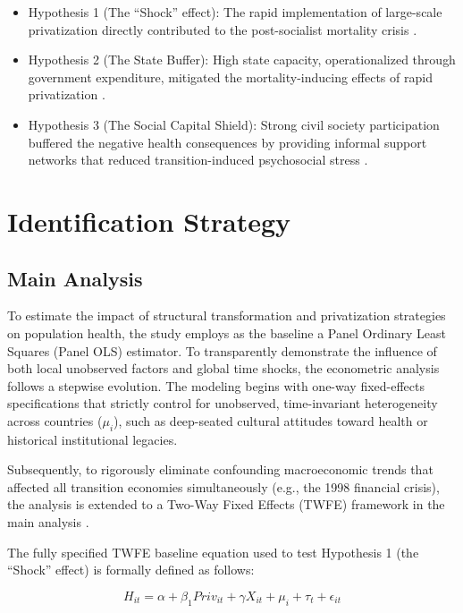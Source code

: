 \documentclass[12pt]{article}
\begin{document}
\begin{itemize}
    \item Hypothesis 1 (The ``Shock'' effect): The rapid implementation of large-scale privatization directly contributed to the post-socialist mortality crisis 
    \citep{Stuckler2009, King2009}.
    \item Hypothesis 2 (The State Buffer): High state capacity, operationalized through government expenditure, mitigated the mortality-inducing effects of rapid privatization 
    \citep{Hamm2012}.
    \item Hypothesis 3 (The Social Capital Shield): Strong civil society participation buffered the negative health consequences by providing informal support networks that reduced 
    transition-induced psychosocial stress \citep{Stuckler2009, Scheiring2018}.
\end{itemize}


\section{Identification Strategy}
\subsection{Main Analysis}

To estimate the impact of structural transformation and privatization strategies on population health, the study employs as the baseline a Panel Ordinary Least Squares (Panel OLS) estimator. To transparently 
demonstrate the influence of both local unobserved factors and global time shocks, the econometric analysis follows a stepwise evolution. The modeling begins with one-way fixed-effects 
specifications that strictly control for unobserved, time-invariant heterogeneity across countries ($\mu_{i}$), such as deep-seated cultural attitudes toward health or historical institutional 
legacies. 

Subsequently, to rigorously eliminate confounding macroeconomic trends that affected all transition economies simultaneously (e.g., the 1998 financial crisis), the analysis is extended 
to a Two-Way Fixed Effects (TWFE) framework in the main analysis \citep{Wooldridge2010, Allison2009}.

The fully specified TWFE baseline equation used to test Hypothesis 1 (the ``Shock'' effect) is formally defined as follows:

\begin{equation}
H_{it}=\alpha+\beta_{1}Priv_{it}+\gamma X_{it}+\mu_{i}+\tau_{t}+\epsilon_{it}
\end{equation}
\end{document}
